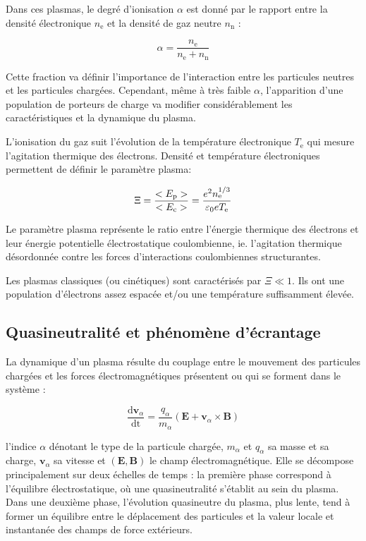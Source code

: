 \begin{refsection}
Dans ces plasmas, le degré d'ionisation $\alpha$ est donné par le rapport
entre la densité électronique $n_\text{e}$ et la densité de gaz neutre
$n_\text{n}$ :

\begin{equation}
\alpha=\frac{n_\text{e}}{n_\text{e}+n_\text{n}}
\end{equation}

Cette fraction va définir l'importance de l'interaction entre les particules
neutres et les particules chargées. Cependant, même à très faible $\alpha$,
l'apparition d'une population de porteurs de charge va modifier considérablement 
les caractéristiques et la dynamique du plasma.

L'ionisation du gaz suit l'évolution de la température électronique $T_\text{e}$
qui mesure l'agitation thermique des électrons. Densité et température
électroniques permettent de définir le paramètre plasma:

\begin{equation}
\label{1-paramPlasma}
\Xi=\frac{<E_\text{p}>}{<E_\text{c}>}=\frac{e^{{2}}
n_\text{e}^{{1/3}}}{\varepsilon{_{0}} eT_\text{e}}
\end{equation}

Le paramètre plasma représente le ratio entre l'énergie thermique des
électrons et leur énergie potentielle électrostatique coulombienne, ie.
l'agitation thermique désordonnée contre les forces d'interactions
coulombiennes structurantes.

Les plasmas classiques (ou cinétiques) sont caractérisés par
$\Xi\ll 1$. Ils ont une population d'électrons assez espacée et/ou une
température suffisamment élevée.

\subsection{Quasineutralité et phénomène d'écrantage}
La dynamique d'un plasma résulte du couplage entre le mouvement des
particules chargées et les forces électromagnétiques présentent ou qui se
forment dans le système :

\begin{equation}
\frac{\text{d} \mathbf
v_\alpha}{\text{dt}}=\frac{q_\alpha}{m_\alpha}(\mathbf E+ \mathbf
v_\alpha\times\mathbf B)
\end{equation}

l'indice $\alpha$ dénotant le type de la particule chargée, $m_\alpha$
et $q_\alpha$ sa masse et sa charge, $\mathbf v_\alpha$ sa vitesse et $(\mathbf
E,\mathbf B)$ le champ électromagnétique.
Elle se décompose principalement sur deux échelles de temps :
la première phase correspond à l'équilibre électrostatique, où une
quasineutralité s'établit au sein du plasma. Dans une deuxième phase, l'évolution quasineutre du
plasma, plus lente, tend à former un équilibre entre le déplacement des particules et la valeur locale
et instantanée des champs de force extérieurs.


\end{refsection}
